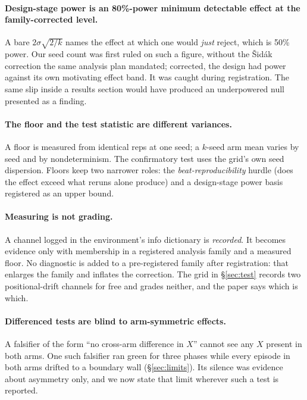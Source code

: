 \paragraph{Design-stage power is an 80\%-power minimum detectable effect at
the family-corrected level.} A bare $2\sigma\sqrt{2/k}$ names the effect at
which one would \emph{just} reject, which is 50\% power. Our seed count was
first ruled on such a figure, without the \v{S}id\'ak correction the same
analysis plan mandated; corrected, the design had  power
against its own motivating effect band. It was caught during registration.
The same slip inside a results section would have produced an underpowered
null presented as a finding.

\paragraph{The floor and the test statistic are different variances.} A floor
is measured from identical reps at one seed; a $k$-seed arm mean varies by
seed and by nondeterminism. The confirmatory test uses the grid's own seed
dispersion. Floors keep two narrower roles: the \emph{beat-reproducibility}
hurdle (does the effect exceed what reruns alone produce) and a design-stage
power basis registered as an upper bound.

\paragraph{Measuring is not grading.} A channel logged in the environment's
info dictionary is \emph{recorded}. It becomes evidence only with membership
in a registered analysis family and a measured floor. No diagnostic is added
to a pre-registered family after registration: that enlarges the family and
inflates the correction. The grid in \S\ref{sec:test} records two
positional-drift channels for free and grades neither, and the paper says
which is which.

\paragraph{Differenced tests are blind to arm-symmetric effects.} A falsifier
of the form ``no cross-arm difference in $X$'' cannot see any $X$ present in
both arms. One such falsifier ran green for three phases while every episode
in both arms drifted to a boundary wall (\S\ref{sec:limits}). Its silence was
evidence about asymmetry only, and we now state that limit wherever such a
test is reported.

